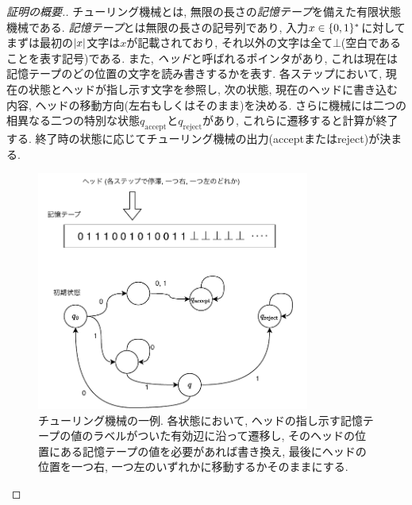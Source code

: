 \begin{proof}[証明の概要.]
  チューリング機械とは, 無限の長さの\emph{記憶テープ}を備えた有限状態機械である.
  \emph{記憶テープ}とは無限の長さの記号列であり, 入力$x\in\{0,1\}^*$に対して
  まずは最初の$\abs{x}$文字は$x$が記載されており, それ以外の文字は全て$\bot$(空白であることを表す記号)である.
  また, \emph{ヘッド}と呼ばれるポインタがあり, これは現在は記憶テープのどの位置の文字を読み書きするかを表す.
  各ステップにおいて, 現在の状態とヘッドが指し示す文字を参照し, 次の状態, 現在のヘッドに書き込む内容, ヘッドの移動方向(左右もしくはそのまま)を決める.
  さらに機械には二つの相異なる二つの特別な状態$q_{\mathrm{accept}}$と$q_{\mathrm{reject}}$があり, これらに遷移すると計算が終了する. 終了時の状態に応じてチューリング機械の出力(acceptまたはreject)が決まる.
  
  \begin{figure}[ht]
    \centering
    \includegraphics[width=0.8\textwidth]{images/Turing.pdf}
    \caption{チューリング機械の一例. 各状態において, ヘッドの指し示す記憶テープの値のラベルがついた有効辺に沿って遷移し, そのヘッドの位置にある記憶テープの値を必要があれば書き換え, 最後にヘッドの位置を一つ右, 一つ左のいずれかに移動するかそのままにする.}
  \end{figure}
  

\end{proof}
